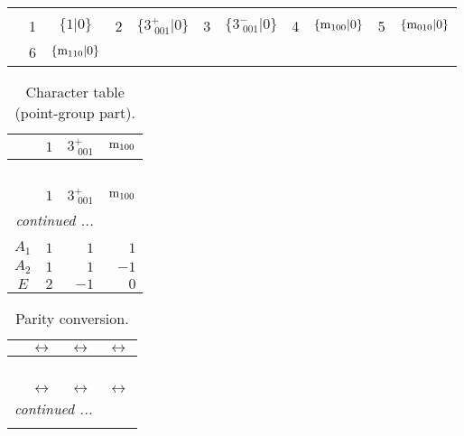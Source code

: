 \documentclass[fleqn,10pt,landscape]{article}
\begin{document}
\begin{itemize}
\begin{center}
\begin{longtable}{c|cc|cc|cc|cc|cc}
 \hline \hline
\multicolumn{10}{r}{} \\ \endlastfoot

 & 1 & $\{1|0\}$ & 2 & $\{3^{+}_{\,\,001}|0\}$ & 3 & $\{3^{-}_{\,\,001}|0\}$ & 4 & $\{{\rm m}_{100}|0\}$ & 5 & $\{{\rm m}_{010}|0\}$ \\
& 6 & $\{{\rm m}_{110}|0\}$ &  &  &  &  &  &  &  &  \\
\end{longtable}
\end{center}
\begin{center}
\renewcommand{\arraystretch}{1.0}
\begin{longtable}{c|rrr}
\caption{Character table (point-group part).}
 \\
 \hline \hline
 & $ 1 $ & $ 3^{+}_{\,\,001} $ & $ {\rm m}_{100} $ \\ \hline \endfirsthead

\multicolumn{3}{l}{\tablename\ \thetable{}} \\
 \hline \hline
 & $ 1 $ & $ 3^{+}_{\,\,001} $ & $ {\rm m}_{100} $ \\ \hline \endhead

 \hline \hline
\multicolumn{3}{r}{\footnotesize\it continued ...} \\ \endfoot

 \hline \hline
\multicolumn{3}{r}{} \\ \endlastfoot

$ A_{1} $ & $ 1 $ & $ 1 $ & $ 1 $ \\
$ A_{2} $ & $ 1 $ & $ 1 $ & $ -1 $ \\
$ E $ & $ 2 $ & $ -1 $ & $ 0 $ \\
\end{longtable}
\end{center}
\begin{center}
\renewcommand{\arraystretch}{1.0}
\begin{longtable}{cccc}
\caption{Parity conversion.}
 \\
 \hline \hline
 & $\leftrightarrow$ & $\leftrightarrow$ & $\leftrightarrow$ \\ \hline \endfirsthead

\multicolumn{3}{l}{\tablename\ \thetable{}} \\
 \hline \hline
 & $\leftrightarrow$ & $\leftrightarrow$ & $\leftrightarrow$ \\ \hline \endhead

 \hline \hline
\multicolumn{3}{r}{\footnotesize\it continued ...} \\ \endfoot


\end{longtable}
\end{center}
\end{itemize}
\end{document}
